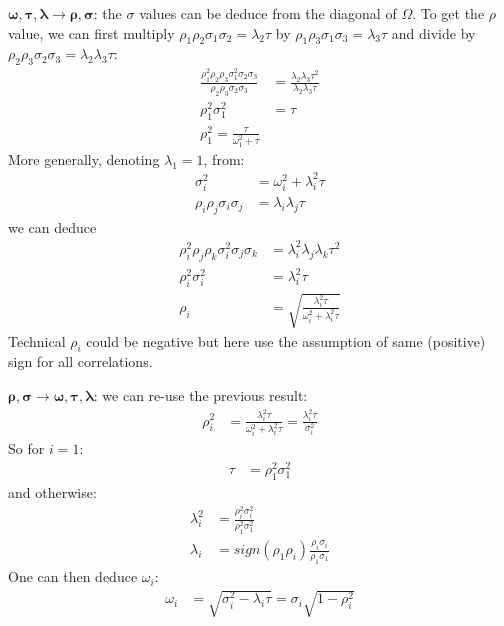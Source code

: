 \documentclass[12pt]{article}
\begin{document}
\(\boldsymbol{\omega},\boldsymbol{\tau},\boldsymbol{\lambda}
\rightarrow \boldsymbol{\rho},\boldsymbol{\sigma}\): the \(\sigma\)
values can be deduce from the diagonal of \(\Omega\). \newline To get the
\(\rho\) value, we can first multiply \(\rho_1 \rho_2 \sigma_1
\sigma_2 = \lambda_2 \tau\) by \(\rho_1 \rho_3 \sigma_1 \sigma_3 =
\lambda_3 \tau\) and divide by \(\rho_2 \rho_3 \sigma_2 \sigma_3 =
\lambda_2 \lambda_3 \tau\):
\begin{align*}
\frac{\rho_1^2 \rho_2 \rho_3 \sigma_1^2 \sigma_2 \sigma_3}{\rho_2 \rho_3 \sigma_2 \sigma_3} &= \frac{\lambda_2 \lambda_3 \tau^2}{\lambda_2 \lambda_3 \tau} \\
\rho_1^2 \sigma_1^2 &= \tau \\
\rho_1^2 = \frac{\tau}{\omega_1^2 + \tau}
\end{align*}
More generally, denoting \(\lambda_1=1\), from:
\begin{align*}
\sigma_i^2  &= \omega_i^2+\lambda_i^2\tau \\
\rho_i \rho_j \sigma_i \sigma_j &= \lambda_i \lambda_j \tau
\end{align*}
we can deduce
\begin{align*}
\rho_i^2 \rho_j \rho_k  \sigma_i^2 \sigma_j \sigma_k &= \lambda_i^2 \lambda_j \lambda_k \tau^2 \\
\rho_i^2  \sigma_i^2 &= \lambda_i^2 \tau \\
\rho_i  &=  \sqrt{\frac{\lambda_i^2 \tau}{\omega_i^2+\lambda_i^2\tau}}
\end{align*}
Technical \(\rho_i\) could be negative but here use the assumption of
same (positive) sign for all correlations.

\bigskip

\(\boldsymbol{\rho},\boldsymbol{\sigma} \rightarrow
\boldsymbol{\omega},\boldsymbol{\tau},\boldsymbol{\lambda}\): we can re-use the previous result:
\begin{align*}
\rho_i^2  &=  \frac{\lambda_i^2 \tau}{\omega_i^2+\lambda_i^2\tau} = \frac{\lambda_i^2 \tau}{\sigma_i^2}
\end{align*}
So for \(i=1\):
\begin{align*}
\tau  &= \rho_1^2 \sigma_1^2
\end{align*}
and otherwise:
\begin{align*}
\lambda_i^2  &=  \frac{\rho_i^2 \sigma_i^2}{\rho_1^2 \sigma_1^2} \\
\lambda_i  &= sign(\rho_1 \rho_i) \frac{\rho_i\sigma_i}{\rho_1 \sigma_1}
\end{align*}
One can then deduce \(\omega_i\):
\begin{align*}
\omega_i  &=  \sqrt{\sigma_i^2 - \lambda_i \tau} = \sigma_i \sqrt{1-\rho_i^2}
\end{align*}
\end{document}
